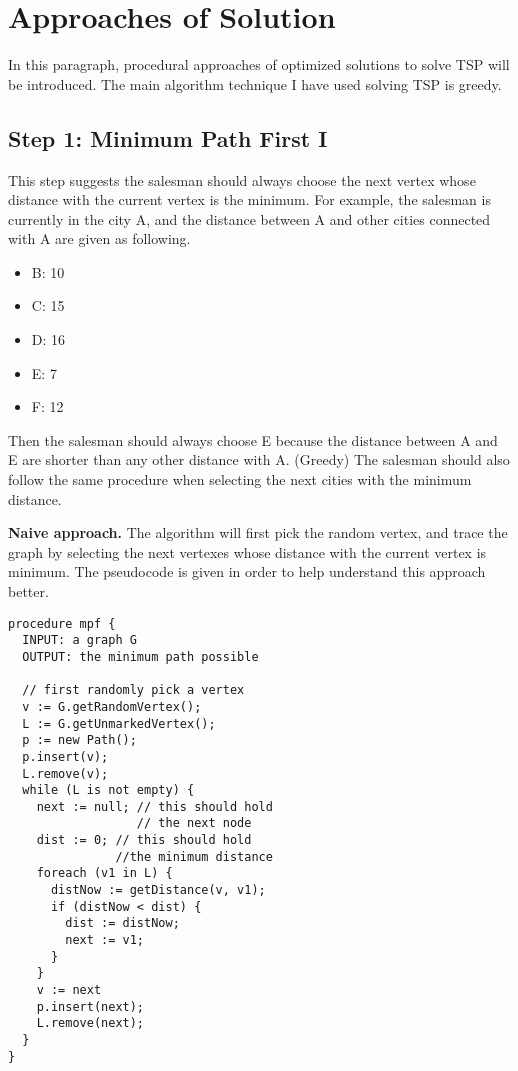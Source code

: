 \documentclass{acm_proc_article-sp}
\begin{document}
\section{Approaches of Solution}
\begin{flushleft}
In this paragraph, procedural approaches of optimized solutions to solve TSP will be introduced. The main algorithm technique I have used solving TSP is greedy.
\end{flushleft}

\subsection{Step 1: Minimum Path First I}
\begin{flushleft}
This step suggests the salesman should always choose the next vertex whose distance with the current vertex is the minimum. For example, the salesman is currently in the city A, and the distance between A and other cities connected with A are given as following.
\end{flushleft}

\begin{itemize}
\item B: 10
\item C: 15
\item D: 16
\item E: 7
\item F: 12
\end{itemize}

\begin{flushleft}
Then the salesman should always choose E because the distance between A and E are shorter than any other distance with A. (Greedy) The salesman should also follow the same procedure when selecting the next cities with the minimum distance.

\textbf{Naive approach.} The algorithm will first pick the random vertex, and trace the graph by selecting the next vertexes whose distance with the current vertex is minimum. The pseudocode is given in order to help understand this approach better.
\end{flushleft}

\begin{lstlisting}
procedure mpf {
  INPUT: a graph G
  OUTPUT: the minimum path possible
  
  // first randomly pick a vertex
  v := G.getRandomVertex();
  L := G.getUnmarkedVertex();
  p := new Path();
  p.insert(v);
  L.remove(v);
  while (L is not empty) {
    next := null; // this should hold
                  // the next node
    dist := 0; // this should hold
               //the minimum distance
    foreach (v1 in L) {
      distNow := getDistance(v, v1);
      if (distNow < dist) {
        dist := distNow;
        next := v1;
      }
    }
    v := next
    p.insert(next);
    L.remove(next);
  }
}
\end{lstlisting}
\end{document}
